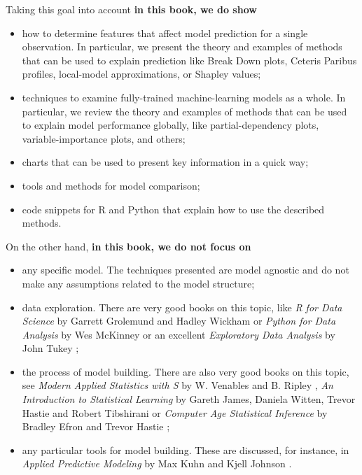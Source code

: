 \documentclass[12pt,]{krantz}
\providecommand{\tightlist}{%
  \setlength{\itemsep}{0pt}\setlength{\parskip}{0pt}}
\begin{document}
Taking this goal into account \textbf{in this book, we do show}

\begin{itemize}
\tightlist
\item
  how to determine features that affect model prediction for a single observation. In particular, we present the theory and examples of methods that can be used to explain prediction like Break Down plots, Ceteris Paribus profiles, local-model approximations, or Shapley values;
\item
  techniques to examine fully-trained machine-learning models as a whole. In particular, we review the theory and examples of methods that can be used to explain model performance globally, like partial-dependency plots, variable-importance plots, and others;
\item
  charts that can be used to present key information in a quick way;
\item
  tools and methods for model comparison;
\item
  code snippets for R and Python that explain how to use the described methods.
\end{itemize}

On the other hand, \textbf{in this book, we do not focus on}

\begin{itemize}
\tightlist
\item
  any specific model. The techniques presented are model agnostic and do not make any assumptions related to the model structure;
\item
  data exploration. There are very good books on this topic, like \emph{R for Data Science} by Garrett Grolemund and Hadley Wickham \citep{r4ds2019} or \emph{Python for Data Analysis} \citep{Wes2012} by Wes McKinney or an excellent \emph{Exploratory Data Analysis} by John Tukey \citep{tukey1977};
\item
  the process of model building. There are also very good books on this topic, see \emph{Modern Applied Statistics with S} by W. Venables and B. Ripley \citep{MASSbook}, \emph{An Introduction to Statistical Learning} by Gareth James, Daniela Witten, Trevor Hastie and Robert Tibshirani \citep{James20147} or \emph{Computer Age Statistical Inference} by Bradley Efron and Trevor Hastie \citep{Efron2016};
\item
  any particular tools for model building. These are discussed, for instance, in \emph{Applied Predictive Modeling} by Max Kuhn and Kjell Johnson \citep{Kuhn2013}.
\end{itemize}
\end{document}
